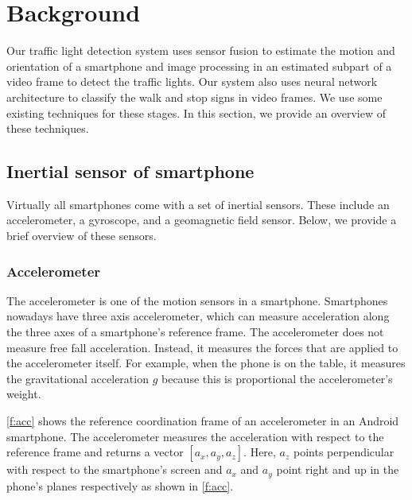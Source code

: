 \chapter{Background}
\label{c:background}
Our traffic light detection system uses sensor fusion to estimate the motion and orientation of a smartphone and image processing in an estimated subpart of a video frame to detect the traffic lights.
Our system also uses neural network architecture to classify the walk and stop signs in video frames.
We use some existing techniques for these stages. 
In this section, we provide an overview of these techniques. 


\section{Inertial sensor of smartphone}
\label{s:sensor}
Virtually all smartphones come with a set of inertial sensors. These include an accelerometer, a gyroscope, and a geomagnetic field sensor. 
Below, we provide a brief overview of these sensors. 


\subsection{Accelerometer}
The accelerometer is one of the motion sensors in a smartphone.
Smartphones nowadays have three axis accelerometer, which can measure acceleration along the three axes of a smartphone's reference frame.
The accelerometer does not measure free fall acceleration.
Instead, it measures the forces that are applied to the accelerometer itself.
For example, when the phone is on the table, it measures the gravitational acceleration $g$ because this is proportional the accelerometer's weight.

\ref{f:acc} shows the reference coordination frame of an accelerometer in an Android smartphone.
The accelerometer measures the acceleration with respect to the reference frame and returns a vector $[a_x, a_y, a_z]$.
Here, $a_z$ points perpendicular with respect to the smartphone's screen and $a_x$ and $a_y$ point right and up in the phone's planes respectively as shown in \ref{f:acc}.

